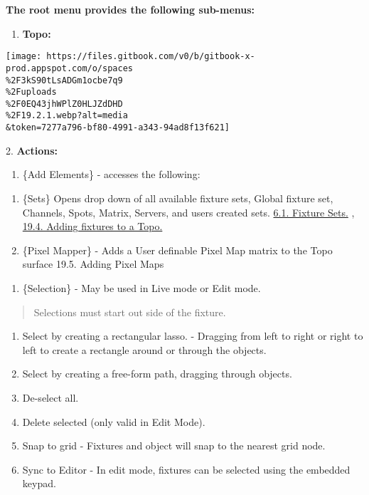 \documentclass[
]{article}
\providecommand{\tightlist}{%
  \setlength{\itemsep}{0pt}\setlength{\parskip}{0pt}}
\begin{document}
\hspace{0pt}

\textbf{The root menu provides the following sub-menus:}

\begin{enumerate}
\def\labelenumi{\arabic{enumi}.}
\tightlist
\item
  \textbf{Topo:}
\end{enumerate}

\texttt{[image: https://files.gitbook.com/v0/b/gitbook-x-prod.appspot.com/o/spaces\\\%2F3kS90tLsADGm1ocbe7q9\\\%2Fuploads\\\%2F0EQ43jhWPlZ0HLJZdDHD\\\%2F19.2.1.webp?alt=media\\\&token=7277a796-bf80-4991-a343-94ad8f13f621]}

\hspace{0pt}
2. \textbf{Actions:}

\begin{enumerate}
\def\labelenumi{\alph{enumi}.}
\tightlist
\item
  \{Add Elements\} - accesses the following:
\end{enumerate}

\begin{enumerate}
\def\labelenumi{\arabic{enumi}.}
\item
  \{Sets\} Opens drop down of all available fixture sets, Global fixture set, Channels, Spots, Matrix, Servers, and users created sets. \href{https://vibemanual.compulite.com/patch.html\#fixture-sets}{6.1. Fixture Sets.} , \href{https://vibemanual.compulite.com/topo-topographical-display.html\#adding-fixtures-to-a-topo}{19.4. Adding fixtures to a Topo.}
\item
  \{Pixel Mapper\} - Adds a User definable Pixel Map matrix to the Topo surface 19.5. Adding Pixel Maps
\end{enumerate}

\begin{enumerate}
\def\labelenumi{\alph{enumi}.}
\setcounter{enumi}{1}
\tightlist
\item
  \{Selection\} - May be used in Live mode or Edit mode.
\end{enumerate}

\begin{quote}
Selections must start out side of the fixture.
\end{quote}

\begin{enumerate}
\def\labelenumi{\arabic{enumi}.}
\item
  Select by creating a rectangular lasso. - Dragging from left to right or right to left to create a rectangle around or through the objects.
\item
  Select by creating a free-form path, dragging through objects.
\item
  De-select all.
\item
  Delete selected (only valid in Edit Mode).
\item
  Snap to grid - Fixtures and object will snap to the nearest grid node.
\item
  Sync to Editor - In edit mode, fixtures can be selected using the embedded keypad.
\end{enumerate}
\end{document}
